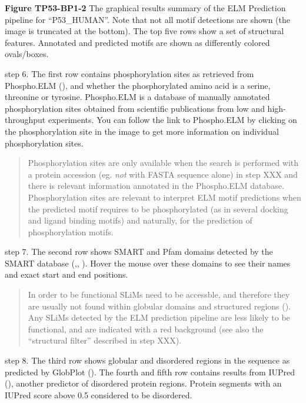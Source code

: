 \textbf{Figure TP53-BP1-2} The graphical results summary of the ELM
Prediction pipeline for ``P53\_HUMAN''. Note that not all motif
detections are shown (the image is truncated at the bottom). The top
five rows show a set of structural features. Annotated and predicted
motifs are shown as differently colored ovals/boxes.

step 6. The first row contains phosphorylation sites as retrieved from
Phospho.ELM (\cite{21062810}), and whether the phosphorylated amino acid
is a serine, threonine or tyrosine. Phospho.ELM is a database of
manually annotated phosphorylation sites obtained from scientific
publications from low and high-throughput experiments. You can follow
the link to Phospho.ELM by clicking on the phosphorylation site in the
image to get more information on individual phosphorylation sites.

\begin{quote}
Phosphorylation sites are only available when the search is performed
with a protein accession (eg. \emph{not} with FASTA sequence alone) in
step XXX and there is relevant information annotated in the Phospho.ELM
database. Phosphorylation sites are relevant to interpret ELM motif
predictions when the predicted motif requires to be phosphorylated (as
in several docking and ligand binding motifs) and naturally, for the
prediction of phosphorylation motifs.
\end{quote}

step 7. The second row shows SMART and Pfam domains detected by the
SMART database (\cite{9600884},\cite{25300481}, \cite{9600884}). Hover
the mouse over these domains to see their names and exact start and end
positions.

\begin{quote}
In order to be functional SLiMs need to be accessble, and therefore they
are usually not found within globular domains and structured regions
(\cite{21909575}). Any SLiMs detected by the ELM prediction pipeline are
less likely to be functional, and are indicated with a red background
(see also the ``structural filter'' described in step XXX).
\end{quote}

step 8. The third row shows globular and disordered regions in the
sequence as predicted by GlobPlot (\cite{12824398}). The fourth and
fifth row contains results from IUPred (\cite{15955779}), another
predictor of disordered protein regions. Protein segments with an IUPred
score above 0.5 considered to be disordered.

